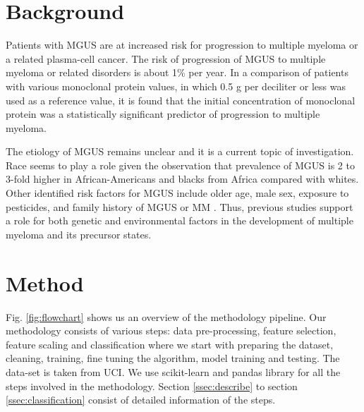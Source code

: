 \documentclass[conference]{IEEEtran}
\begin{document}
\section{Background}
\par
Patients with MGUS are at increased risk for progression to multiple myeloma or a related plasma-cell cancer. The risk of progression of MGUS to multiple myeloma or related disorders is about 1\% per year. \cite{monoclonal1,monoclonal2} In a comparison of patients with various monoclonal protein values, in which 0.5 g per deciliter or less was used as a reference value, it is found that the initial concentration of monoclonal protein was a statistically significant predictor of progression to multiple myeloma.

\par

The etiology of MGUS remains unclear and it is a current topic of investigation. Race seems to play a role given the observation that prevalence of MGUS is 2 to 3-fold higher in African-Americans and blacks from Africa compared with whites. \cite{monoclonal6, monoclonal7} Other identified risk factors for MGUS include older age, male sex, exposure to pesticides, and family history of MGUS or MM \cite{monoclonal9,monoclonal10,monoclonal11}. Thus, previous studies support a role for both genetic and environmental factors in the development of multiple myeloma and its precursor states. \cite{monoclonal12}

\section{Method}                                                                     
Fig. \ref{fig:flowchart} shows us an overview of the methodology pipeline. Our methodology consists of various steps: data pre-processing, feature selection, feature scaling and classification where we start with preparing the dataset, cleaning, training, fine tuning the algorithm, model training and testing. The data-set is taken from UCI\cite{uci}. We use scikit-learn \cite{scikit} and pandas library for all the steps involved in the methodology. Section \ref{ssec:describe} to section \ref{ssec:classification} consist of detailed information of the steps.     
\par              
\end{document}
